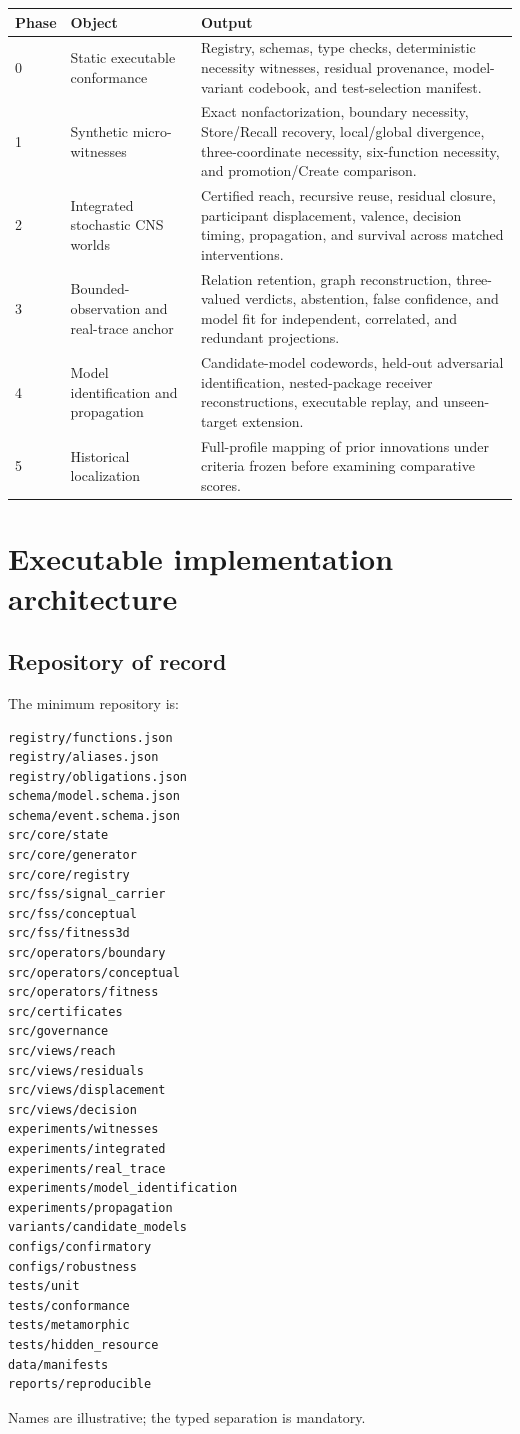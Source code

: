 \documentclass[11pt]{article}
\begin{document}
\begin{longtable}{p{}p{}p{}}
\toprule
\textbf{Phase} & \textbf{Object} & \textbf{Output}\\
\midrule\endhead
0 & Static executable conformance & Registry, schemas, type checks, deterministic necessity witnesses, residual provenance, model-variant codebook, and test-selection manifest.\\
1 & Synthetic micro-witnesses & Exact nonfactorization, boundary necessity, Store/Recall recovery, local/global divergence, three-coordinate necessity, six-function necessity, and promotion/Create comparison.\\
2 & Integrated stochastic CNS worlds & Certified reach, recursive reuse, residual closure, participant displacement, valence, decision timing, propagation, and survival across matched interventions.\\
3 & Bounded-observation and real-trace anchor & Relation retention, graph reconstruction, three-valued verdicts, abstention, false confidence, and model fit for independent, correlated, and redundant projections.\\
4 & Model identification and propagation & Candidate-model codewords, held-out adversarial identification, nested-package receiver reconstructions, executable replay, and unseen-target extension.\\
5 & Historical localization & Full-profile mapping of prior innovations under criteria frozen before examining comparative scores.\\
\bottomrule
\end{longtable}

\section{Executable implementation architecture}

\subsection{Repository of record}

The minimum repository is:
\begin{verbatim}
registry/functions.json
registry/aliases.json
registry/obligations.json
schema/model.schema.json
schema/event.schema.json
src/core/state
src/core/generator
src/core/registry
src/fss/signal_carrier
src/fss/conceptual
src/fss/fitness3d
src/operators/boundary
src/operators/conceptual
src/operators/fitness
src/certificates
src/governance
src/views/reach
src/views/residuals
src/views/displacement
src/views/decision
experiments/witnesses
experiments/integrated
experiments/real_trace
experiments/model_identification
experiments/propagation
variants/candidate_models
configs/confirmatory
configs/robustness
tests/unit
tests/conformance
tests/metamorphic
tests/hidden_resource
data/manifests
reports/reproducible
\end{verbatim}
Names are illustrative; the typed separation is mandatory.
\end{document}
